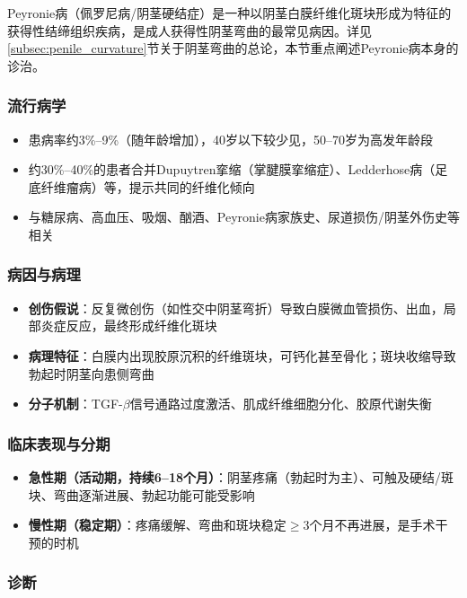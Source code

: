 Peyronie病（佩罗尼病/阴茎硬结症）是一种以阴茎白膜纤维化斑块形成为特征的获得性结缔组织疾病，是成人获得性阴茎弯曲的最常见病因。详见\ref{subsec:penile_curvature}节关于阴茎弯曲的总论，本节重点阐述Peyronie病本身的诊治。

\subsubsection{流行病学}

\begin{itemize}[leftmargin=2cm]
	\item 患病率约3\%--9\%（随年龄增加），40岁以下较少见，50--70岁为高发年龄段
	\item 约30\%--40\%的患者合并Dupuytren挛缩（掌腱膜挛缩症）、Ledderhose病（足底纤维瘤病）等，提示共同的纤维化倾向
	\item 与糖尿病、高血压、吸烟、酗酒、Peyronie病家族史、尿道损伤/阴茎外伤史等相关
\end{itemize}

\subsubsection{病因与病理}

\begin{itemize}[leftmargin=2cm]
	\item \textbf{创伤假说}：反复微创伤（如性交中阴茎弯折）导致白膜微血管损伤、出血，局部炎症反应，最终形成纤维化斑块
	\item \textbf{病理特征}：白膜内出现胶原沉积的纤维斑块，可钙化甚至骨化；斑块收缩导致勃起时阴茎向患侧弯曲
	\item \textbf{分子机制}：TGF-$\beta$信号通路过度激活、肌成纤维细胞分化、胶原代谢失衡
\end{itemize}

\subsubsection{临床表现与分期}

\begin{itemize}[leftmargin=2cm]
	\item \textbf{急性期（活动期，持续6--18个月）}：阴茎疼痛（勃起时为主）、可触及硬结/斑块、弯曲逐渐进展、勃起功能可能受影响
	\item \textbf{慢性期（稳定期）}：疼痛缓解、弯曲和斑块稳定$\ge$3个月不再进展，是手术干预的时机
\end{itemize}

\subsubsection{诊断}

